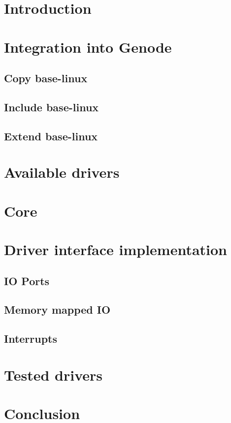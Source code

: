 \documentclass[
a4paper,
12pt,
notitlepage,
parskip=half,
DIV=11,
]{scrartcl}
\begin{document}
\section{Introduction}
\section{Integration into Genode}
	\subsection{Copy base-linux}
	\subsection{Include base-linux}
	\subsection{Extend base-linux}
\section{Available drivers}
\section{Core}
\section{Driver interface implementation}
	\subsection{IO Ports}
	\subsection{Memory mapped IO}
	\subsection{Interrupts}
\section{Tested drivers}
\section{Conclusion}
\end{document}
